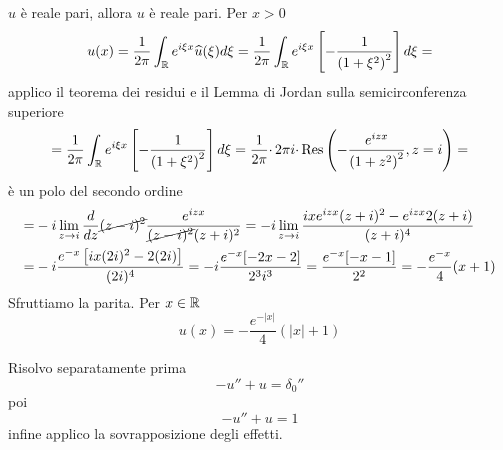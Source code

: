 $\hat{u}$ è reale pari, allora $u$ è reale pari. Per $x >0$
\begin{equation*}
u( x) =\frac{1}{2\pi }\int _{\mathbb{R} } e^{i\xi x}\widehat{u}( \xi ) d\xi =\frac{1}{2\pi }\int _{\mathbb{R} } e^{i\xi x}\left[ -\frac{1}{\left( 1+\xi ^{2}\right)^{2}}\right] d\xi =
\end{equation*}
applico il teorema dei residui e il Lemma di Jordan sulla semicirconferenza superiore
\begin{equation*}
=\frac{1}{2\pi }\int _{\mathbb{R} } e^{i\xi x}\left[ -\frac{1}{\left( 1+\xi ^{2}\right)^{2}}\right] d\xi =\frac{1}{2\pi } \cdotp 2\pi i\cdotp \operatorname{Res} \left( -\frac{e^{izx}}{\left( 1+z^{2}\right)^{2}} ,z=i\right) =
\end{equation*}
è un polo del secondo ordine
\begin{equation*}
\begin{aligned}
= & -i\lim\limits _{z\rightarrow i}\frac{d}{dz}\cancel{( z-i)^{2}}\frac{e^{izx}}{\cancel{( z-i)^{2}}( z+i)^{2}} =-i\lim\limits _{z\rightarrow i}\frac{ixe^{izx}( z+i)^{2} -e^{izx} 2( z+i)}{( z+i)^{4}}\\
= & -i\frac{e^{-x}\left[ ix( 2i)^{2} -2( 2i)\right]}{( 2i)^{4}} =-i\frac{e^{-x}[ -2x-2]}{2^{3} i^{3}} =\frac{e^{-x}[ -x-1]}{2^{2}} =-\frac{e^{-x}}{4}( x+1)
\end{aligned}
\end{equation*}
Sfruttiamo la parita. Per $x\in \mathbb{R} $
\begin{equation*}
u( x) =-\frac{e^{-| x| }}{4}(| x| +1)
\end{equation*}
\Soluzione

Risolvo separatamente prima
\begin{equation*}
-u''+u=\delta _{0} ''
\end{equation*}
poi
\begin{equation*}
-u''+u=1
\end{equation*}
infine applico la sovrapposizione degli effetti.

